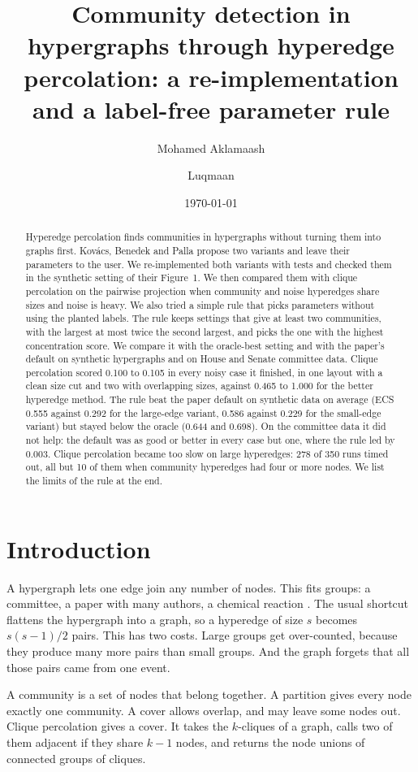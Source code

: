 \documentclass[11pt,a4paper]{article}
\title{Community detection in hypergraphs through hyperedge percolation: a re-implementation and a label-free parameter rule}
\author{Mohamed Aklamaash \and Luqmaan}
\date{\today}
\begin{document}
\maketitle

\begin{abstract}
Hyperedge percolation finds communities in hypergraphs without turning them into graphs first. Kov\'acs, Benedek and Palla propose two variants and leave their parameters to the user. We re-implemented both variants with tests and checked them in the synthetic setting of their Figure~1. We then compared them with clique percolation on the pairwise projection when community and noise hyperedges share sizes and noise is heavy. We also tried a simple rule that picks parameters without using the planted labels. The rule keeps settings that give at least two communities, with the largest at most twice the second largest, and picks the one with the highest concentration score. We compare it with the oracle-best setting and with the paper's default on synthetic hypergraphs and on House and Senate committee data. Clique percolation scored 0.100 to 0.105 in every noisy case it finished, in one layout with a clean size cut and two with overlapping sizes, against 0.465 to 1.000 for the better hyperedge method. The rule beat the paper default on synthetic data on average (ECS 0.555 against 0.292 for the large-edge variant, 0.586 against 0.229 for the small-edge variant) but stayed below the oracle (0.644 and 0.698). On the committee data it did not help: the default was as good or better in every case but one, where the rule led by 0.003. Clique percolation became too slow on large hyperedges: 278 of 350 runs timed out, all but 10 of them when community hyperedges had four or more nodes. We list the limits of the rule at the end.
\end{abstract}

\section{Introduction}
A hypergraph lets one edge join any number of nodes. This fits groups: a committee, a paper with many authors, a chemical reaction \cite{battiston2020}. The usual shortcut flattens the hypergraph into a graph, so a hyperedge of size $s$ becomes $s(s-1)/2$ pairs. This has two costs. Large groups get over-counted, because they produce many more pairs than small groups. And the graph forgets that all those pairs came from one event.

A community is a set of nodes that belong together. A partition gives every node exactly one community. A cover allows overlap, and may leave some nodes out. Clique percolation \cite{palla2005} gives a cover. It takes the $k$-cliques of a graph, calls two of them adjacent if they share $k-1$ nodes, and returns the node unions of connected groups of cliques.
\end{document}
